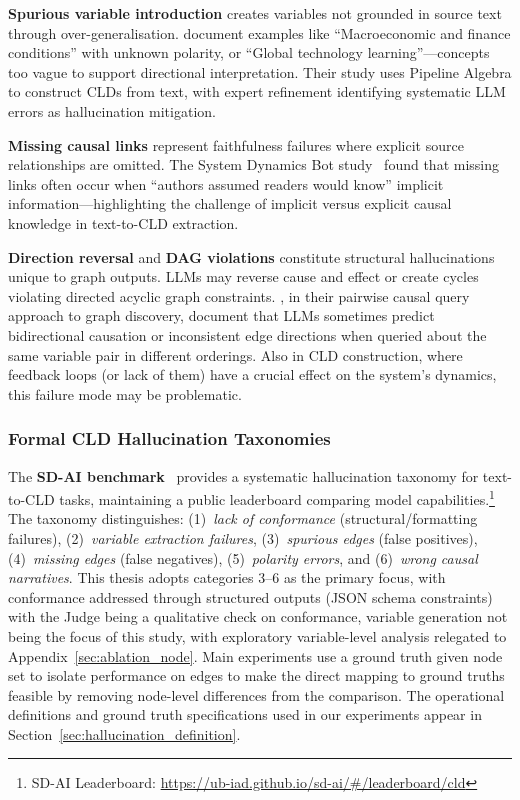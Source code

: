 \textbf{Spurious variable introduction} creates variables not grounded in source text through over-generalisation. \citet{reinholtz2025pipelinealgebra} document examples like ``Macroeconomic and finance conditions'' with unknown polarity, or ``Global technology learning''---concepts too vague to support directional interpretation. Their study uses Pipeline Algebra to construct CLDs from text, with expert refinement identifying systematic LLM errors as hallucination mitigation.

\textbf{Missing causal links} represent faithfulness failures where explicit source relationships are omitted. The System Dynamics Bot study~\citep{hosseinichimeh2024textmapdynamicsbot} found that missing links often occur when ``authors assumed readers would know'' implicit information---highlighting the challenge of implicit versus explicit causal knowledge in text-to-CLD extraction.

\textbf{Direction reversal} and \textbf{DAG violations} constitute structural hallucinations unique to graph outputs. LLMs may reverse cause and effect or create cycles violating directed acyclic graph constraints. \citet{jiralerspong2024efficientcausalgraphdiscovery}, in their pairwise causal query approach to graph discovery, document that LLMs sometimes predict bidirectional causation or inconsistent edge directions when queried about the same variable pair in different orderings. Also in CLD construction, where feedback loops (or lack of them) have a crucial effect on the system's dynamics, this failure mode may be problematic.

\subsubsection{Formal CLD Hallucination Taxonomies}
\label{sec:sd_ai_taxonomy}

The \textbf{SD-AI benchmark}~\citep{schoenberg2025aibuildsdmodels} provides a systematic hallucination taxonomy for text-to-CLD tasks, maintaining a public leaderboard comparing model capabilities.\footnote{SD-AI Leaderboard: \url{https://ub-iad.github.io/sd-ai/\#/leaderboard/cld}} The taxonomy distinguishes: (1)~\textit{lack of conformance} (structural/formatting failures), (2)~\textit{variable extraction failures}, (3)~\textit{spurious edges} (false positives), (4)~\textit{missing edges} (false negatives), (5)~\textit{polarity errors}, and (6)~\textit{wrong causal narratives}. This thesis adopts categories 3--6 as the primary focus, with conformance addressed through structured outputs (JSON schema constraints) with the Judge being a qualitative check on conformance, variable generation not being the focus of this study, with exploratory variable-level analysis relegated to Appendix~\ref{sec:ablation_node}. Main experiments use a ground truth given node set to isolate performance on edges to make the direct mapping to ground truths feasible by removing node-level differences from the comparison. The operational definitions and ground truth specifications used in our experiments appear in Section~\ref{sec:hallucination_definition}.

